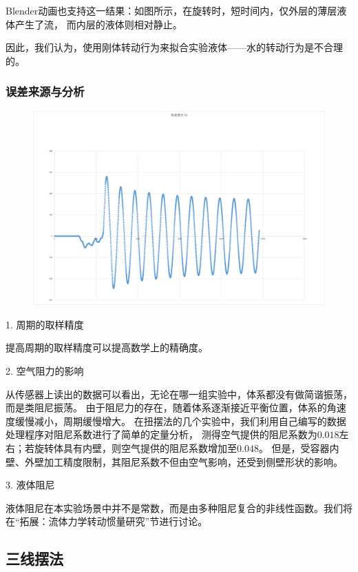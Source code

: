 \documentclass[12pt,hyperref,a4paper,UTF8]{ctexart}
\begin{document}
Blender动画也支持这一结果：如图所示，在旋转时，短时间内，仅外层的薄层液体产生了流，
而内层的液体则相对静止。

因此，我们认为，使用刚体转动行为来拟合实验液体——水的转动行为是不合理的。

\subsubsection{误差来源与分析}

\begin{figure}[htbp]
    \centering
    \includegraphics[scale=0.1]{damp.eps}
    \caption{}
\end{figure}

1. 周期的取样精度

提高周期的取样精度可以提高数学上的精确度。

2. 空气阻力的影响

从传感器上读出的数据可以看出，无论在哪一组实验中，体系都没有做简谐振荡，而是类阻尼振荡。
由于阻尼力的存在，随着体系逐渐接近平衡位置，体系的角速度缓慢减小，周期缓慢增大。
在扭摆法的几个实验中，我们利用自己编写的数据处理程序对阻尼系数进行了简单的定量分析，
测得空气提供的阻尼系数为$0.018$左右；若旋转体具有内壁，则空气提供的阻尼系数增加至$0.048$。
但是，受容器内壁、外壁加工精度限制，其阻尼系数不但由空气影响，还受到侧壁形状的影响。

3. 液体阻尼

液体阻尼在本实验场景中并不是常数，而是由多种阻尼复合的非线性函数。我们将在“拓展：流体力学转动惯量研究”节进行讨论。

\subsection{三线摆法}
\end{document}
